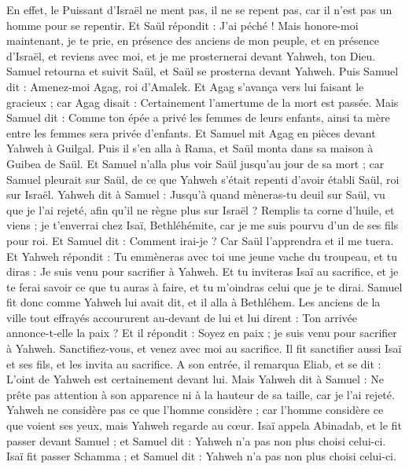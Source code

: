 \begin{multicols}{2}
En effet, le Puissant d'Israël ne ment pas, il ne se repent pas, car il n'est pas un homme pour se repentir.
Et Saül répondit : J'ai péché ! Mais honore-moi maintenant, je te prie, en présence des anciens de mon peuple, et en présence d'Israël, et reviens avec moi, et je me prosternerai devant Yahweh, ton Dieu.
Samuel retourna et suivit Saül, et Saül se prosterna devant Yahweh.
Puis Samuel dit : Amenez-moi Agag, roi d'Amalek. Et Agag s’avança vers lui faisant le gracieux ; car Agag disait : Certainement l'amertume de la mort est passée.
Mais Samuel dit : Comme ton épée a privé les femmes de leurs enfants, ainsi ta mère entre les femmes sera privée d'enfants. Et Samuel mit Agag en pièces devant Yahweh à Guilgal.
Puis il s'en alla à Rama, et Saül monta dans sa maison à Guibea de Saül.
Et Samuel n'alla plus voir Saül jusqu'au jour de sa mort ; car Samuel pleurait sur Saül, de ce que Yahweh s'était repenti d'avoir établi Saül, roi sur Israël.
\VerseOne{}Yahweh dit à Samuel : Jusqu'à quand mèneras-tu deuil sur Saül, vu que je l'ai rejeté, afin qu'il ne règne plus sur Israël ? Remplis ta corne d'huile, et viens ; je t’enverrai chez Isaï, Bethléhémite, car je me suis pourvu d'un de ses fils pour roi.
Et Samuel dit : Comment irai-je ? Car Saül l’apprendra et il me tuera. Et Yahweh répondit : Tu emmèneras avec toi une jeune vache du troupeau, et tu diras : Je suis venu pour sacrifier à Yahweh.
Et tu inviteras Isaï au sacrifice, et je te ferai savoir ce que tu auras à faire, et tu m'oindras celui que je te dirai.
Samuel fit donc comme Yahweh lui avait dit, et il alla à Bethléhem. Les anciens de la ville tout effrayés accoururent au-devant de lui et lui dirent : Ton arrivée annonce-t-elle la paix ?
Et il répondit : Soyez en paix ; je suis venu pour sacrifier à Yahweh. Sanctifiez-vous, et venez avec moi au sacrifice. Il fit sanctifier aussi Isaï et ses fils, et les invita au sacrifice.
A son entrée, il remarqua Eliab, et se dit : L'oint de Yahweh est certainement devant lui.
Mais Yahweh dit à Samuel : Ne prête pas attention à son apparence ni à la hauteur de sa taille, car je l'ai rejeté. Yahweh ne considère pas ce que l'homme considère ; car l'homme considère ce que voient ses yeux, mais Yahweh regarde au cœur.
Isaï appela Abinadab, et le fit passer devant Samuel ; et Samuel dit : Yahweh n'a pas non plus choisi celui-ci.
Isaï fit passer Schamma ; et Samuel dit : Yahweh n'a pas non plus choisi celui-ci.

\end{multicols}
